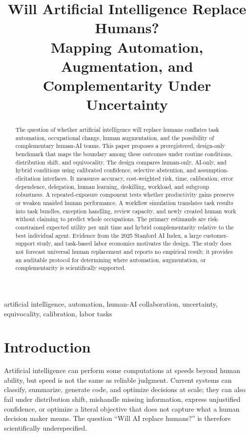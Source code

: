 \documentclass[conference]{IEEEtran}
\title{Will Artificial Intelligence Replace Humans?\\
Mapping Automation, Augmentation, and Complementarity Under Uncertainty}
\author{\IEEEauthorblockN{Xcientist Research Team}
\IEEEauthorblockA{Interdisciplinary Artificial Intelligence Research\\
Design-only research report\\
September 2026}}
\begin{document}
\maketitle

\begin{abstract}
The question of whether artificial intelligence will replace humans conflates task automation, occupational change, human augmentation, and the possibility of complementary human-AI teams. This paper proposes a preregistered, design-only benchmark that maps the boundary among these outcomes under routine conditions, distribution shift, and equivocality. The design compares human-only, AI-only, and hybrid conditions using calibrated confidence, selective abstention, and assumption-elicitation interfaces. It measures accuracy, cost-weighted risk, time, calibration, error dependence, delegation, human learning, deskilling, workload, and subgroup robustness. A repeated-exposure component tests whether productivity gains preserve or weaken unaided human performance. A workflow simulation translates task results into task bundles, exception handling, review capacity, and newly created human work without claiming to predict whole occupations. The primary estimands are risk-constrained expected utility per unit time and hybrid complementarity relative to the best individual agent. Evidence from the 2025 Stanford AI Index, a large customer-support study, and task-based labor economics motivates the design. The study does not forecast universal human replacement and reports no empirical result; it provides an auditable protocol for determining where automation, augmentation, or complementarity is scientifically supported.
\end{abstract}

\begin{IEEEkeywords}
artificial intelligence, automation, human-AI collaboration, uncertainty, equivocality, calibration, labor tasks
\end{IEEEkeywords}

\section{Introduction}

Artificial intelligence can perform some computations at speeds beyond human ability, but speed is not the same as reliable judgment. Current systems can classify, summarize, generate code, and optimize decisions at scale; they can also fail under distribution shift, mishandle missing information, express unjustified confidence, or optimize a literal objective that does not capture what a human decision maker means. The question ``Will AI replace humans?'' is therefore scientifically underspecified.
\end{document}
